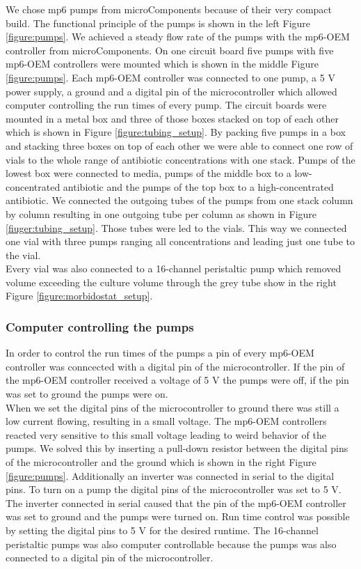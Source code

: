 We chose mp6 pumps from microComponents because of their very compact build. The functional principle of the pumps is shown in the left Figure \ref{figure:pumps}. We achieved a steady flow rate of the pumps with the mp6-OEM controller from microComponents. On one circuit board five pumps with five mp6-OEM controllers were mounted which is shown in the middle Figure \ref{figure:pumps}. Each mp6-OEM controller was connected to one pump, a 5 V power supply, a ground and a digital pin of  the microcontroller which allowed computer controlling the run times of every pump. The circuit boards were mounted in a metal box and three of those boxes stacked on top of each other which is shown in Figure \ref{figure:tubing_setup}. By packing five pumps in a box and stacking three boxes on top of each other we were able to connect one row of vials to the whole range of antibiotic concentrations with one stack. Pumps of the lowest box were connected to media, pumps of the middle box to a low-concentrated antibiotic and the pumps of the top box to a high-concentrated antibiotic. We connected the outgoing tubes of the pumps from one stack column by column resulting in one outgoing tube per column as shown in Figure \ref{fiuger:tubing_setup}. Those tubes were led to the vials. This way we connected one vial with three pumps ranging all concentrations and leading just one tube to the vial.\\
Every vial was also connected to a 16-channel peristaltic pump which removed volume exceeding the culture volume through the grey tube show in the right Figure \ref{figure:morbidostat_setup}. 

\subsubsection{Computer controlling the pumps}
In order to control the run times of the pumps a pin of every mp6-OEM controller was conncected with a digital pin of the microcontroller. If the pin of the mp6-OEM controller received a voltage of 5 V the pumps were off, if the pin was set to ground the pumps were on. \\
When we set the digital pins of the microcontroller to ground there was still a low current flowing, resulting in a small voltage. The mp6-OEM controllers reacted very sensitive to this small voltage leading to weird behavior of the pumps. We solved this by inserting a pull-down resistor between the digital pins of the microcontroller and the ground which is shown in the right Figure \ref{figure:pumps}. Additionally an inverter was connected in serial to the digital pins. To turn on a pump the digital pins of the microcontroller was set to 5 V. The inverter connected in serial caused that the pin of the mp6-OEM controller was set to ground and the pumps were turned on. Run time control was possible by setting the digital pins to 5 V for the desired runtime.
The 16-channel peristaltic pumps was also computer controllable because the pumps was also connected to a digital pin of the microcontroller.
\label{section:pumps}

